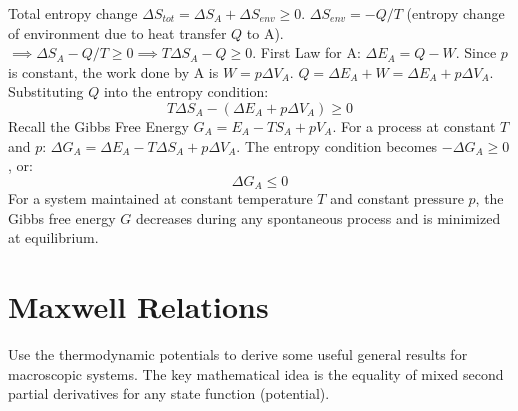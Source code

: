 \documentclass[11pt]{article}
\begin{document}
Total entropy change $\Delta S_{tot} = \Delta S_A + \Delta S_{env} \ge 0$.
$\Delta S_{env} = -Q/T$ (entropy change of environment due to heat transfer $Q$ to A).
$\implies \Delta S_A - Q/T \ge 0 \implies T \Delta S_A - Q \ge 0$.
First Law for A: $\Delta E_A = Q - W$. Since $p$ is constant, the work done by A is $W = p \Delta V_A$.
$Q = \Delta E_A + W = \Delta E_A + p \Delta V_A$.
Substituting $Q$ into the entropy condition:
\[ T \Delta S_A - (\Delta E_A + p \Delta V_A) \ge 0 \]
Recall the Gibbs Free Energy $G_A = E_A - TS_A + pV_A$. For a process at constant $T$ and $p$:
$\Delta G_A = \Delta E_A - T \Delta S_A + p \Delta V_A$.
The entropy condition becomes $- \Delta G_A \ge 0$, or:
\[ \Delta G_A \le 0 \]
For a system maintained at constant temperature $T$ and constant pressure $p$, the Gibbs free energy $G$ decreases during any spontaneous process and is minimized at equilibrium.

\section*{Maxwell Relations}

Use the thermodynamic potentials to derive some useful general results for macroscopic systems. The key mathematical idea is the equality of mixed second partial derivatives for any state function (potential).
\end{document}
